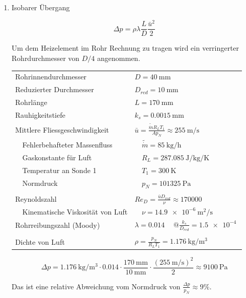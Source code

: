 \documentclass[a4paper,10pt,oneside]{article}
\begin{document}
\begin{enumerate}
\item Isobarer Übergang

\begin{equation}
\Delta p=\rho\lambda\frac{L}{D}\frac{\bar{u}^2}{2}
\end{equation}

Um dem Heizelement im Rohr Rechnung zu tragen wird ein verringerter Rohrdurchmesser von $D/4$ angenommen.

\textcolor{mygray}{
\begin{tabular}{l@{$\quad$}l}
Rohrinnendurchmesser&$D = \SI{40}{\milli\meter}$\\
Reduzierter Durchmesser&$D_{red} = \SI{10}{\milli\meter}$\\
Rohrlänge&$L=\SI{170}{\milli\meter}$\\
Rauhigkeitstiefe&$k_s=\SI{0.0015}{\milli\meter}$\\
Mittlere Fliessgeschwindigkeit&$\bar{u}=\frac{\tilde{\dot{m}} R_L T_1}{A p_N}\approx\SI{255}{\meter\per\second}$\\
$\quad$Fehlerbehafteter Massenfluss&$\quad\tilde{\dot{m}}=\SI{85}{\kilo\gram\per\hour}$\\
$\quad$Gaskonstante für Luft&$\quad R_L=\SI{287.085}{\joule\per\kilo\gram\per\kelvin}$\\
$\quad$Temperatur an Sonde 1&$\quad T_1=\SI{300}{\kelvin}$\\
$\quad$Normdruck&$\quad p_N=\SI{101325}{\pascal}$\\
\\
Reynoldszahl&$Re_D=\frac{\bar{u}D_{red}}{\nu}\approx\SI{170000}{}$\\
$\quad$Kinematische Viskosität von Luft&$\quad\nu=\SI{14.9e-6}{\meter\squared\per\second}$\\
Rohrreibungszahl (Moody)&$\lambda=\SI{0.014}{}\quad @\frac{k_s}{D_{red}}=\SI{1.5e-4}{}$\\
\\
Dichte von Luft&$\rho=\frac{p_N}{R_LT_1}=\SI{1.176}{\kilo\gram\per\meter\cubed}$
\end{tabular}}

\vspace{1.5ex}

\[\Delta p=\SI{1.176}{\kilo\gram\per\meter\cubed}\cdot 0.014\cdot\frac{\SI{170}{\milli\meter}}{\SI{10}{\milli\meter}}\cdot\frac{(\SI{255}{\meter\per\second})^2}{2}\approx\SI{9100}{\pascal}\]

Das ist eine relative Abweichung vom Normdruck von $\frac{\Delta p}{p_N}\approx 9\%$.


\end{enumerate}
\end{document}
